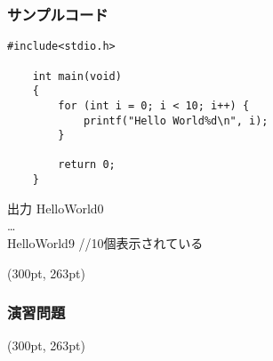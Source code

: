 \documentclass[dvipdfmx]{beamer}
\begin{document}
\begin{frame}[t, fragile]
    \frametitle{サンプルコード}
    \vspace{-20pt}
    \begin{lstlisting}[gobble=4, caption=pra\_ for.c, label=pra-for]
    #include<stdio.h>

    int main(void)
    {
        for (int i = 0; i < 10; i++) {
            printf("Hello World%d\n", i); 
        }

        return 0;
    }
    \end{lstlisting}
    \begin{block}{出力}
    Hello\space World0\\
    \dots\\
    Hello\space World9 //10個表示されている
    \end{block}
    \begin{textblock*}{0.3\linewidth}(300pt, 263pt)
    \space
    \end{textblock*}
\end{frame}

\begin{frame}[t, fragile]
    \frametitle{演習問題}
    \begin{textblock*}{0.3\linewidth}(300pt, 263pt)
    \space
    \end{textblock*}
\end{frame}
\end{document}
